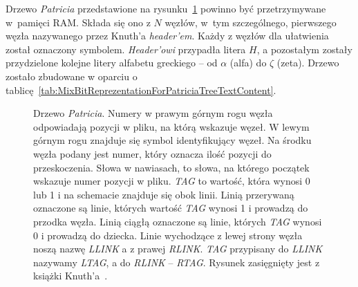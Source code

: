 	Drzewo \emph{Patricia} przedstawione na rysunku~\ref{fig:PatriciaTree} powinno być przetrzymywane w~pamięci RAM. Składa się ono z $N$ węzłów, w~tym szczególnego, pierwszego węzła nazywanego przez Knuth'a \emph{header'em}. Każdy z węzłów dla ułatwienia został oznaczony symbolem. \emph{Header'owi} przypadła litera $H$, a pozostałym zostały przydzielone kolejne litery alfabetu greckiego -- od $\alpha$ (alfa) do $\zeta$ (zeta). Drzewo zostało zbudowane w oparciu o tablicę~\ref{tab:MixBitReprezentationForPatriciaTreeTextContent}.\newline
	
		\begin{figure}[H]
		\caption{Drzewo \emph{Patricia}. Numery w prawym górnym rogu węzła odpowiadają pozycji w pliku, na którą wskazuje węzeł. W lewym górnym rogu znajduje się symbol identyfikujący węzeł. Na środku węzła podany jest numer, który oznacza ilość pozycji do przeskoczenia. Słowa w nawiasach, to słowa, na którego początek wskazuje numer pozycji w pliku. \emph{TAG} to wartość, która wynosi 0 lub 1 i na schemacie znajduje się obok linii. Linią przerywaną oznaczone są linie, których wartość \emph{TAG} wynosi 1 i prowadzą do przodka węzła. Linią ciągłą oznaczone są linie, których \emph{TAG} wynosi 0 i prowadzą do dziecka. Linie wychodzące z lewej strony węzła noszą nazwę \emph{LLINK} a z prawej \emph{RLINK}. \emph{TAG} przypisany do \emph{LLINK} nazywamy \emph{LTAG}, a do \emph{RLINK} -- \emph{RTAG}. Rysunek  zasięgnięty jest z książki Knuth'a~\cite{KnuthsTheArtOfComputerProgramming3}.}\label{fig:PatriciaTree}
		\centering
\end{figure}
